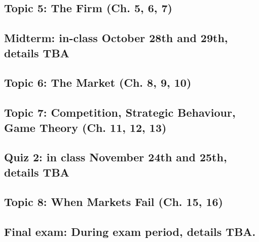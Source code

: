 \documentclass[11pt,]{article}
\begin{document}
\hypertarget{topic-5-the-firm-ch.-5-6-7}{%
\subsection{Topic 5: The Firm (Ch. 5, 6,
7)}\label{topic-5-the-firm-ch.-5-6-7}}

\hypertarget{midterm-week-of-october-26th-details-tba}{%
\subsection{Midterm: in-class October 28th and 29th, details
TBA}\label{midterm-week-of-october-26th-details-tba}}

\hypertarget{topic-6-the-market-ch.-8-9-10}{%
\subsection{Topic 6: The Market (Ch. 8, 9,
10)}\label{topic-6-the-market-ch.-8-9-10}}

\hypertarget{topic-7-competition-strategic-behaviour-game-theory-ch.-11-12-13}{%
\subsection{Topic 7: Competition, Strategic Behaviour, Game Theory (Ch.
11, 12,
13)}\label{topic-7-competition-strategic-behaviour-game-theory-ch.-11-12-13}}

\hypertarget{quiz-2-week-of-november-22-details-tba}{%
\subsection{Quiz 2: in class November 24th and 25th, details
TBA}\label{quiz-2-week-of-november-22-details-tba}}

\hypertarget{topic-8-when-markets-fail-ch.-15-16}{%
\subsection{Topic 8: When Markets Fail (Ch. 15,
16)}\label{topic-8-when-markets-fail-ch.-15-16}}

\hypertarget{final-exam-during-exam-period-details-tba.}{%
\subsection{Final exam: During exam period, details
TBA.}\label{final-exam-during-exam-period-details-tba}}

\newpage
\end{document}
